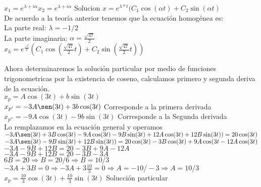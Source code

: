 \documentclass[12pt,a4paper]{article}
\begin{document}
$x_{1}=e^{\lambda+i\alpha}$\hspace{2cm}$x_{2}=e^{\lambda+i\alpha }$\hspace{2cm} Solucion  $x=e^{\lambda*t }(C_{1}\cos(\alpha t)+C_{2}\sin(\alpha t)$\\

De acuerdo a la teoría anterior tenemos que la ecuación homogénea es:\\

La parte real: $\lambda =-1/2$\\

La parte imaginaria: $\alpha =\frac{\sqrt{47}}{2}$\\
 
$x_{h}=e^{\frac{-t}{2} }(C_{1}\cos(\frac{\sqrt{47}}{2} t)+C_{2}\sin(\frac{\sqrt{47}}{2} t))$

\vfill
Ahora determinaremos la solución particular por medio de funciones trigonometricas por la existencia de coseno, calculamos primero y segunda deriva de la ecuación.\\

$x_{p}=A\cos(3t)+b\sin(3t)$\\

$x_{p'}=-3A\sen(3t)+3b\cos(3t)$ Corresponde a la primera derivada\\  

$x_{p''}=-9A\cos(3t)-9b\sin(3t)$ Corresponde a la Segunda derivada\\

Lo remplazamos en la ecuación general y operamos\\

$-3A\sen(3t)+3B\cos(3t)-9A\cos(3t)-9B\sin(3t)+12A\cos(3t)+12B\sin(3t))=20\cos(3t)$  \\

$-3A\sen(3t)-9B\sin(3t)+12B\sin(3t))=20\cos(3t)-3B\cos(3t)+9A\cos(3t-12A\cos(3t)$\\

$-3A-9B+12B=20-3B+9A-12A$\\

$-3A-9B+12B=20-3B-3A$\\

$6B=20 \Rightarrow B=20/6 \Rightarrow B=10/3$\\

$-3A+3B=0 \Rightarrow -3A+3\frac{10}{3}=0 \Rightarrow A=-10/-3 \Rightarrow A=10/3$\\

\textbf{$x_{p}=\frac{10}{3}\cos(3t)+\frac{10}{3}\sin(3t)$}\hspace{0.5cm} Solucción particular\\
\end{document}
